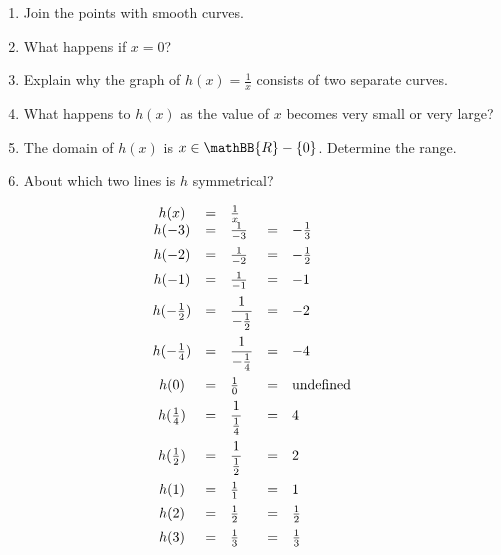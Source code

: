 \begin{wex}
{\begin{enumerate}[noitemsep, label=\textbf{\arabic*}. ] 
 \item Join the points with smooth curves.
\item What happens if $x=0$?
\item Explain why the graph of $h(x)=\frac{1}{x}$ consists of two separate curves.
\item What happens to $h(x)$ as the value of $x$ becomes very small or very large?
\item The domain of $h(x)$ is $x \in \mathBB{R} - \{0\}$. Determine the range.
\item About which two lines is $h$ symmetrical?
\end{enumerate}
}
{
\begin{equation*}
 \begin{array}{cllll}
  h(x) &=& \frac{1}{x} & &\\
 h(-3) &=& \frac{1}{-3} &=& -\frac{1}{3} \vspace{5pt}\\ 
 h(-2) &=& \frac{1}{-2} &=& -\frac{1}{2}\vspace{5pt} \\ 
 h(-1) &=& \frac{1}{-1} &=& -1 \vspace{5pt}\\ 
 h(-\frac{1}{2}) &=& \dfrac{1}{-\frac{1}{2}} &=& -2 \vspace{5pt}\\ 
 h(-\frac{1}{4}) &=& \dfrac{1}{-\frac{1}{4}} &=& -4 \vspace{5pt}\\ 
 h(0) &=& \frac{1}{0} &=& \mbox{undefined}\vspace{5pt} \\ 
 h(\frac{1}{4}) &=& \dfrac{1}{\frac{1}{4}} &=& 4 \vspace{5pt}\\ 
 h(\frac{1}{2}) &=& \dfrac{1}{\frac{1}{2}} &=& 2 \vspace{5pt}\\ 
 h(1) &=& \frac{1}{1} &=& 1 \vspace{5pt}\\ 
 h(2) &=& \frac{1}{2} &=& \frac{1}{2} \vspace{5pt}\\ 
 h(3) &=& \frac{1}{3} &=& \frac{1}{3} \vspace{5pt}\\ 
 \end{array}
\end{equation*}
}
\end{wex}
